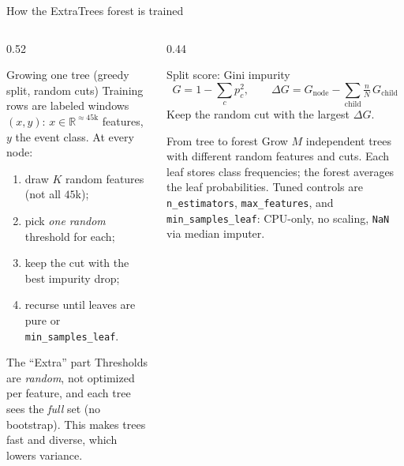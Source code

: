 \documentclass[aspectratio=169,10pt,t]{beamer}
\newcommand{\code}[1]{\texttt{\footnotesize #1}}
\begin{document}
\begin{frame}{How the ExtraTrees forest is trained}
\scriptsize
\begin{columns}[T,totalwidth=\textwidth]
\begin{column}{0.52\textwidth}
\begin{block}{Growing one tree (greedy split, random cuts)}
Training rows are labeled windows $(x,y)$: $x\in\mathbb{R}^{\approx 45\mathrm{k}}$ features, $y$ the event class. At every node:
\begin{enumerate}
\setlength{\itemsep}{0pt}
  \item draw $K$ random features (not all $45$k);
  \item pick \emph{one random} threshold for each;
  \item keep the cut with the best impurity drop;
  \item recurse until leaves are pure or \code{min\_samples\_leaf}.
\end{enumerate}
\end{block}
\begin{alertblock}{The ``Extra'' part}
Thresholds are \emph{random}, not optimized per feature, and each tree sees the \emph{full} set (no bootstrap). This makes trees fast and diverse, which lowers variance.
\end{alertblock}
\end{column}
\begin{column}{0.44\textwidth}
\begin{exampleblock}{Split score: Gini impurity}
\[
G=1-\sum_c p_c^2,\qquad
\Delta G = G_{\mathrm{node}}-\!\!\sum_{\mathrm{child}}\tfrac{n}{N}\,G_{\mathrm{child}}
\]
Keep the random cut with the largest $\Delta G$.
\end{exampleblock}
\begin{block}{From tree to forest}
Grow $M$ independent trees with different random features and cuts. Each leaf stores class frequencies; the forest averages the leaf probabilities. Tuned controls are \code{n\_estimators}, \code{max\_features}, and \code{min\_samples\_leaf}: CPU-only, no scaling, \code{NaN} via median imputer.
\end{block}
\end{column}
\end{columns}
\end{frame}
\end{document}
